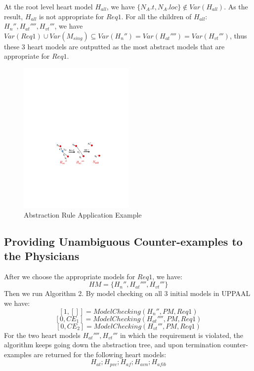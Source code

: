 At the root level heart model $H_{all}$, we have $\{N_A.t,N_A.loc\}\not\in Var(H_{all})$. As the result, $H_{all}$ is not appropriate for $Req1$. For all the children of $H_{all}$: $H_n'',H_{at}'''',H_{vt}'''$, we have $Var(Req1)\cup Var(M_{sing})\subseteq Var(H_n'')=Var(H_{at}'''')=Var(H_{vt}''')$, thus these 3 heart models are outputted as the most abstract models that are appropriate for $Req1$.
\begin{figure}[!t]
	\centering
	\includegraphics[width=0.5\textwidth]{figs/abs_sim.pdf}
	\caption{\small Abstraction Rule Application Example}
	\label{fig:abs_exam}
\end{figure}
\subsection{Providing Unambiguous Counter-examples to the Physicians}
After we choose the appropriate models for $Req1$, we have: 
$$HM=\{H_n'',H_{at}'''',H_{vt}'''\}$$
Then we run Algorithm 2. By model checking on all 3 initial models in UPPAAL we have: 
$$[1,[]]=ModelChecking(H_n'',PM,Req1)$$
 $$[0,CE_1]=ModelChecking(H_{at}'''',PM,Req1)$$
$$[0,CE_2]=ModelChecking(H_{vt}''',PM,Req1)$$
For the two heart models $H_{at}'''',H_{vt}'''$ in which the requirement is violated, the algorithm keeps going down the abstraction tree, and upon termination counter-examples are returned for the following heart models:
$$H_{at};H_{pvc};H_{af};H_{avn};H_{afib}$$

